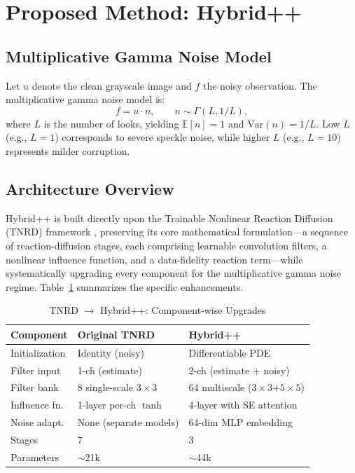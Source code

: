 \documentclass[conference]{IEEEtran}
\begin{document}
\section{Proposed Method: Hybrid++}

\subsection{Multiplicative Gamma Noise Model}
Let $u$ denote the clean grayscale image and $f$ the noisy observation. The multiplicative gamma noise model is:
\begin{equation}
f = u \cdot n, \qquad n \sim \Gamma(L, 1/L),
\end{equation}
where $L$ is the number of looks, yielding $\mathbb{E}[n]=1$ and $\text{Var}(n)=1/L$. Low $L$ (e.g., $L{=}1$) corresponds to severe speckle noise, while higher $L$ (e.g., $L{=}10$) represents milder corruption.

\subsection{Architecture Overview}
Hybrid++ is built directly upon the Trainable Nonlinear Reaction Diffusion (TNRD) framework \cite{chen2017tnrd}, preserving its core mathematical formulation---a sequence of reaction-diffusion stages, each comprising learnable convolution filters, a nonlinear influence function, and a data-fidelity reaction term---while systematically upgrading every component for the multiplicative gamma noise regime. Table~\ref{tab:tnrd_upgrade} summarizes the specific enhancements.

\begin{table}[t]
\caption{TNRD $\to$ Hybrid++: Component-wise Upgrades}
\label{tab:tnrd_upgrade}
\centering
\small
\begin{tabular}{lll}
\toprule
Component & Original TNRD & Hybrid++ \\
\midrule
Initialization & Identity (noisy) & Differentiable PDE \\
Filter input & 1-ch (estimate) & 2-ch (estimate + noisy) \\
Filter bank & 8 single-scale $3{\times}3$ & 64 multiscale ($3{\times}3$+$5{\times}5$) \\
Influence fn. & 1-layer per-ch $\tanh$ & 4-layer with SE attention \\
Noise adapt. & None (separate models) & 64-dim MLP embedding \\
Stages & 7 & 3 \\
Parameters & ${\sim}$21k & ${\sim}$44k \\
\bottomrule
\end{tabular}
\end{table}
\end{document}
